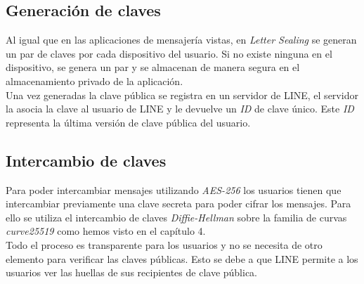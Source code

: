 \subsection{Generación de claves}
Al igual que en las aplicaciones de mensajería vistas, en \emph{Letter Sealing} se generan un par de claves por cada dispositivo del usuario. Si no existe ninguna en el dispositivo, se genera un par y se almacenan de manera segura en el almacenamiento privado de la aplicación.\\
Una vez generadas la clave pública se registra en un servidor de LINE, el servidor la asocia la clave al usuario de LINE y le devuelve un \emph{ID} de clave único. Este \emph{ID} representa la última versión de clave pública del usuario. 

\subsection{Intercambio de claves}
Para poder intercambiar mensajes utilizando \emph{AES-256} los usuarios tienen que intercambiar previamente una clave secreta para poder cifrar los mensajes. Para ello se utiliza el intercambio de claves \emph{Diffie-Hellman} sobre la familia de curvas \emph{curve25519} como hemos visto en el capítulo 4.\\
Todo el proceso es transparente para los usuarios y no se necesita de otro elemento para verificar las claves públicas. Esto se debe a que LINE permite a los usuarios ver las huellas de sus recipientes de clave pública.

